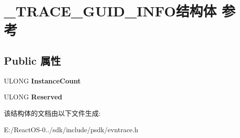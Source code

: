 \hypertarget{struct___t_r_a_c_e___g_u_i_d___i_n_f_o}{}\section{\+\_\+\+T\+R\+A\+C\+E\+\_\+\+G\+U\+I\+D\+\_\+\+I\+N\+F\+O结构体 参考}
\label{struct___t_r_a_c_e___g_u_i_d___i_n_f_o}
\subsection*{Public 属性}
\begin{DoxyCompactItemize}
\item 
\mbox{\label{struct___t_r_a_c_e___g_u_i_d___i_n_f_o_ada3bee06437b9ce4e9dd80c379a014c3}} 
U\+L\+O\+NG {\bfseries Instance\+Count}
\item 
\mbox{\label{struct___t_r_a_c_e___g_u_i_d___i_n_f_o_a51feec13e7fde1dfad9ddcfb64b5948e}} 
U\+L\+O\+NG {\bfseries Reserved}
\end{DoxyCompactItemize}


该结构体的文档由以下文件生成\+:\begin{DoxyCompactItemize}
\item 
E\+:/\+React\+O\+S-\/0../sdk/include/psdk/evntrace.\+h\end{DoxyCompactItemize}
